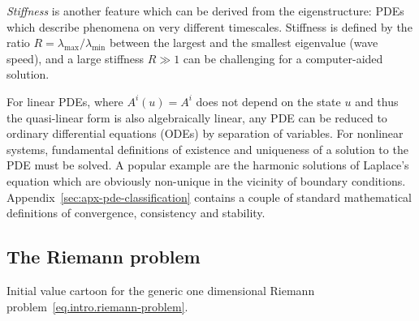 \emph{Stiffness} is another feature which can be derived from the eigenstructure:
PDEs which describe phenomena on very different timescales. Stiffness is defined 
by the ratio $R=\lambda_\text{max}/\lambda_\text{min}$ between the largest and the
smallest eigenvalue (wave speed), and a large stiffness $R\gg 1$ can be challenging
for a computer-aided solution.

For linear PDEs, where $A^i(u) = A^i$ does not depend on the state $u$ and thus the
quasi-linear form is also algebraically linear, any PDE can be
reduced to ordinary differential equations (ODEs) by separation of variables.
For nonlinear systems, fundamental definitions of existence and uniqueness of a
solution to the PDE must be solved. A popular example are the harmonic solutions
of Laplace's equation which are obviously non-unique in the vicinity of boundary
conditions. Appendix~\ref{sec:apx-pde-classification} contains a couple of standard
mathematical definitions of convergence, consistency and stability.

\subsection{The Riemann problem}\label{sec:riemann-problem}
\begin{marginfigure}[2cm]
\caption[
  Riemann problem cartoon, TikZ figure, \exclusive
]{Initial value cartoon for the generic one dimensional Riemann
  problem~\eqref{eq.intro.riemann-problem}.}
\end{marginfigure}

